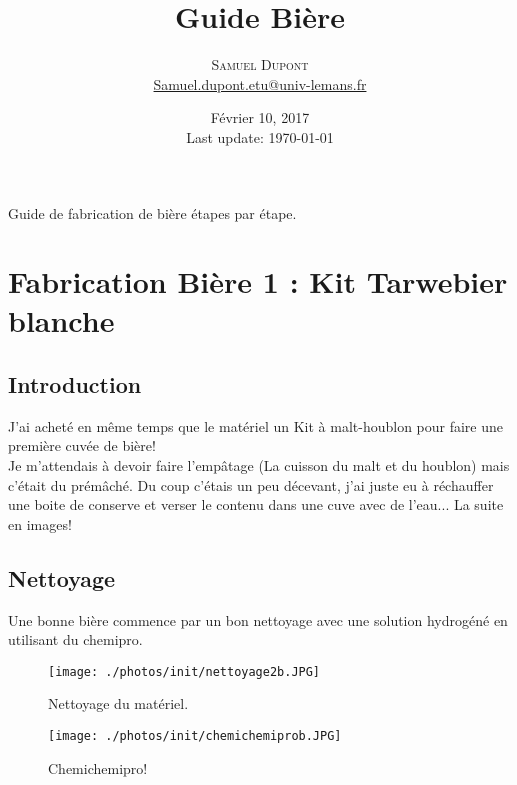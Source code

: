 \documentclass[twoside,twocolumn]{report}
\title{Guide Bière } %
\author{%
\textsc{Samuel Dupont}\\ %
\normalsize \href{mailto:Samuel.dupont.etu@univ-lemans.fr}{Samuel.dupont.etu@univ-lemans.fr } 
}
\date{Février 10, 2017 \\ Last update: \today}
\begin{document}
\maketitle

	Guide de fabrication de bière étapes par étape.
	\chapter*{Fabrication Bière 1 : Kit Tarwebier blanche}
		\section{Introduction}
			J'ai acheté en même temps que le matériel un Kit à malt-houblon pour faire une première cuvée de bière!\\
			Je m'attendais à devoir faire l'empâtage (La cuisson du malt et du houblon) mais c'était du prémâché. Du coup c'étais un peu décevant, j'ai juste eu à réchauffer une boite de conserve et verser le contenu dans une cuve avec de l'eau... La suite en images!
		\section{Nettoyage}
			Une bonne bière commence par un bon nettoyage avec une solution hydrogéné en utilisant du chemipro.
			\begin{figure}[h!]
				\centering
				\texttt{[image: ./photos/init/nettoyage2b.JPG]}
				\caption{Nettoyage du matériel.}
				\label{netoyage}
			\end{figure}
			\begin{figure}[h!]
				\centering
				\texttt{[image: ./photos/init/chemichemiprob.JPG]}
				\caption{Chemichemipro!}
				\label{chemi}
			\end{figure}
\end{document}
